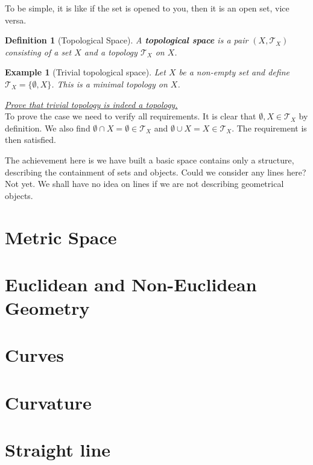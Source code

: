 \documentclass[12pt]{article}
\newtheorem{definition}{Definition}[section]
\newtheorem*{example}{Example}
\renewenvironment{proof}[1][Proof]{\begin{snugshade*} \underline{\textit{{#1}.}}\\}{\hfill \qedsymbol \end{snugshade*}}
\begin{document}
    To be simple, it is like if the set is opened to you, then it is an open set, vice versa.

    \begin{definition}[Topological Space]
        A \textbf{topological space} is a pair $(X,\mathcal{T}_X)$ consisting of a set $X$ and a topology $\mathcal{T}_X$ on $X$.
    \end{definition}

    \begin{example}[Trivial topological space]
        Let $X$ be a non-empty set and define $\mathcal{T}_X=\{\emptyset, X\}$. This is a minimal topology on $X$.
    \end{example}

    \begin{proof}[Prove that trivial topology is indeed a topology]
        To prove the case we need to verify all requirements. It is clear that $\emptyset, X\in\mathcal{T}_X$ by definition. We also find $\emptyset\cap X=\emptyset\in\mathcal{T}_X$ and $\emptyset\cup X = X\in\mathcal{T}_X$. The requirement is then satisfied.
    \end{proof}

    The achievement here is we have built a basic space contains only a structure, describing the containment of sets and objects. Could we consider any lines here? Not yet. We shall have no idea on lines if we are not describing geometrical objects.

    \section{Metric Space}

    \section{Euclidean and Non-Euclidean Geometry}

    \section{Curves}

    \section{Curvature}

    \section{Straight line}
    
\end{document}

